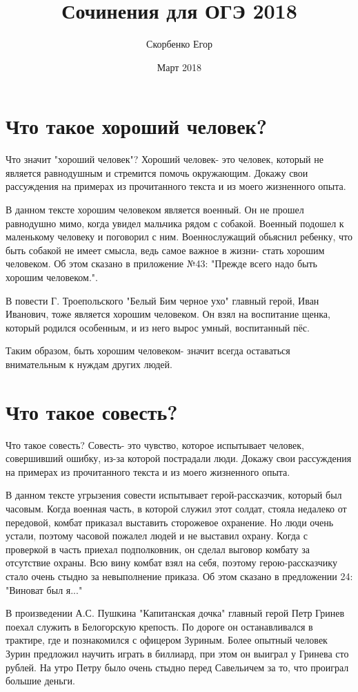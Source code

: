 \documentclass[12pt, letterpaper]{article}
\title{Сочинения для ОГЭ 2018}
\author{Скорбенко Егор}
\date{Март 2018}
\begin{document}
\maketitle
\tableofcontents

\section {Что такое хороший человек?}
Что значит "хороший человек"? Хороший человек- это человек, который не является равнодушным и стремится помочь окружающим. Докажу свои рассуждения на примерах из прочитанного текста и из моего жизненного опыта.

В данном тексте хорошим человеком является военный. Он не прошел равнодушно мимо, когда увидел мальчика рядом с собакой. Военный подошел к маленькому человеку и поговорил с ним. Военнослужащий обьяснил ребенку, что быть собакой не имеет смысла, ведь самое важное в жизни- стать хорошим человеком. Об этом сказано в приложение №43: "Прежде всего надо быть хорошим человеком.".

В повести Г. Троепольского "Белый Бим черное ухо" главный герой, Иван Иванович, тоже является хорошим человеком. Он взял на воспитание щенка, который родился особенным, и из него вырос умный, воспитанный пёс.

Таким образом, быть хорошим человеком- значит всегда оставаться внимательным к нуждам других людей.

\section {Что такое совесть?}

Что такое совесть? Совесть- это чувство, которое испытывает человек, совершивший ошибку, из-за которой пострадали люди. Докажу свои рассуждения на примерах из прочитанного текста и из моего жизненного опыта.

В данном тексте угрызения совести испытывает герой-рассказчик, который был часовым. Когда военная часть, в которой служил этот солдат, стояла недалеко от передовой, комбат приказал выставить сторожевое охранение. Но люди очень устали, поэтому часовой пожалел людей и не выставил охрану. Когда с проверкой в часть приехал подполковник, он сделал выговор комбату за отсутствие охраны. Всю вину комбат взял на себя, поэтому герою-рассказчику стало очень стыдно за невыполнение приказа. Об этом сказано в предложении 24: "Виноват был я..."

В произведении А.С. Пушкина "Капитанская дочка" главный герой Петр Гринев поехал служить в Белогорскую крепость. По дороге он останавливался в трактире, где и познакомился с офицером Зуриным. Более опытный человек Зурин предложил научить играть в биллиард, при этом он выиграл у Гринева сто рублей. На утро Петру было очень стыдно перед Савельичем за то, что проиграл большие деньги. 
\end{document}
